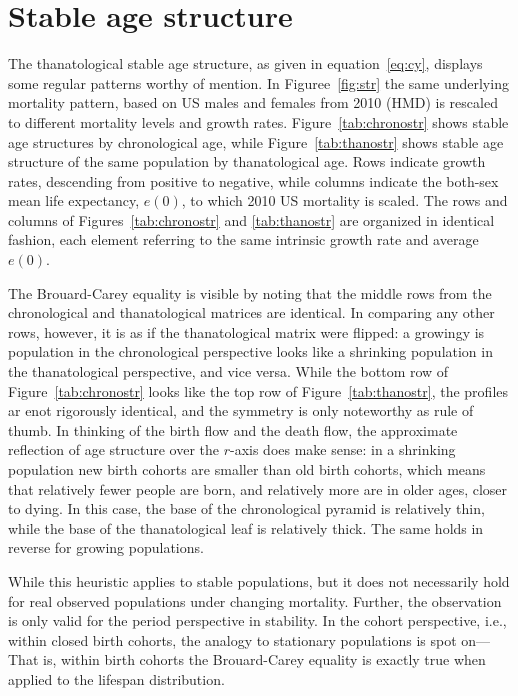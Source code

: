 \documentclass{article}
\begin{document}
\section*{Stable age structure}
The thanatological stable age structure, as given in equation~\eqref{eq:cy},
displays some regular patterns worthy of mention. In Figuree~\ref{fig:str} the
same underlying mortality pattern, based on US males and females from 2010 (HMD) is rescaled to different mortality levels and growth
rates. Figure~\ref{tab:chronostr} shows stable age structures by chronological
age, while Figure~\ref{tab:thanostr} shows stable age structure of the same
population by thanatological age. Rows indicate growth rates, descending from
positive to negative, while columns indicate the both-sex mean life expectancy,
$e(0)$, to which 2010 US mortality is scaled. The rows and columns of
Figures~\ref{tab:chronostr} and \ref{tab:thanostr} are organized in identical
fashion, each element referring to the same intrinsic growth rate and average
$e(0)$.

The Brouard-Carey equality is visible by noting that the middle rows from the
chronological and thanatological matrices are identical. In comparing any other
rows, however, it is as if the thanatological matrix were flipped: a growingy is population in the chronological perspective looks like a shrinking
population in the thanatological perspective, and vice versa. While the bottom row of
Figure~\ref{tab:chronostr} looks like the top row of Figure~\ref{tab:thanostr},
the profiles ar enot rigorously identical, and the symmetry is only noteworthy
as rule of thumb. In thinking of the birth flow and the death flow, the
approximate reflection of age structure over the $r$-axis does make sense: in a
shrinking population new birth cohorts are smaller than old birth cohorts, which
means that relatively fewer people are born, and relatively more are in older
ages, closer to dying. In this case, the base of the chronological pyramid is
relatively thin, while the base of the thanatological leaf is relatively thick.
The same holds in reverse for growing populations. 

While this heuristic applies to stable populations, but it does not necessarily
hold for real observed populations under changing mortality. Further, the observation is only
valid for the period perspective in stability. In the cohort perspective, i.e.,
within closed birth cohorts, the analogy to stationary populations is spot on--- That is, within birth cohorts
the Brouard-Carey equality is exactly true when applied to the lifespan
distribution.
  
\end{document}
